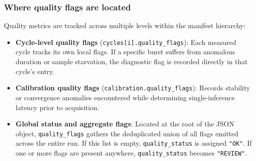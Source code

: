 \subsubsection{Where quality flags are located}
Quality metrics are tracked across multiple levels within the manifest hierarchy:
\begin{itemize}
    \item \textbf{Cycle-level quality flags} (\texttt{cycles[i].quality\_flags}): Each measured cycle tracks its own local flags. If a specific burst suffers from anomalous duration or sample starvation, the diagnostic flag is recorded directly in that cycle's entry.
    \item \textbf{Calibration quality flags} (\texttt{calibration.quality\_flags}): Records stability or convergence anomalies encountered while determining single-inference latency prior to acquisition.
    \item \textbf{Global status and aggregate flags}: Located at the root of the JSON object, \texttt{quality\_flags} gathers the deduplicated union of all flags emitted across the entire run. If this list is empty, \texttt{quality\_status} is assigned \texttt{"OK"}. If one or more flags are present anywhere, \texttt{quality\_status} becomes \texttt{"REVIEW"}.
\end{itemize}

